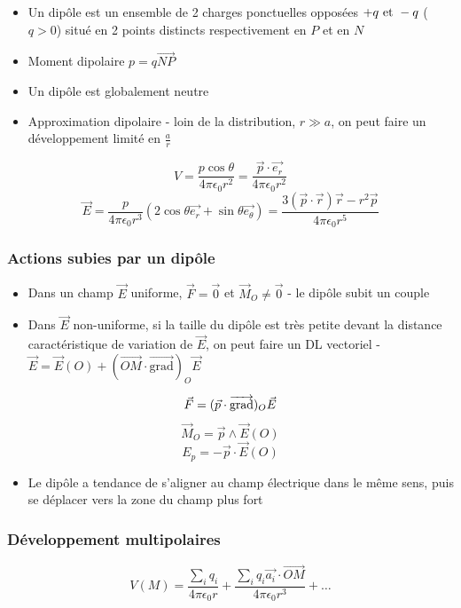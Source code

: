 \documentclass[openany]{book}
\begin{document}
\begin{itemize}
    \item Un dipôle est un ensemble de 2 charges ponctuelles opposées $+q \text{ et } -q$ ($q > 0$) situé en 2 points distincts respectivement en $P$ et en $N$
    \item Moment dipolaire $p = q \overrightarrow{NP}$  
    \item Un dipôle est globalement neutre
    \item Approximation dipolaire - loin de la distribution, $r \gg a$, on peut faire un développement limité en $\frac{a}{r}$
\end{itemize}

\[ V = \frac{p \cos \theta}{4 \pi \epsilon_0 r^2} = \frac{\vec{p}\cdot\vec{e_r}}{4\pi\epsilon_0 r^2} \]
\[ \vec{E} = \frac{p}{4 \pi\epsilon_0r^3}(2 \cos \theta \vec{e_r} + \sin \theta \vec{e_{\theta}}) = \frac{3(\vec{p} \cdot \vec{r})\vec{r} - r^2\vec{p}}{4\pi\epsilon_0r^5} \]

\subsubsection{Actions subies par un dipôle}

\begin{itemize}
    \item Dans un champ $\vec{E}$ uniforme, $\vec{F} = \vec{0}$ et $\vec{M}_O \neq \vec{0}$ - le dipôle subit un couple
    \item Dans $\vec{E}$ non-uniforme, si la taille du dipôle est très petite devant la distance caractéristique de variation de $\vec{E}$, on peut faire un DL vectoriel - $\vec{E} = \vec{E}(O) + (\overrightarrow{OM} \cdot \overrightarrow{\text{grad}})_O \vec{E}$ 
\end{itemize}

\[ \vec{F} = (\vec{p}\cdot\overrightarrow{{\text{grad}}})_O \vec{E} \]
\[ \vec{M}_O = \vec{p} \wedge \vec{E}(O) \]
\[ E_p = - \vec{p} \cdot \vec{E}(O) \]

\begin{itemize}
    \item Le dipôle a tendance de s'aligner au champ électrique dans le même sens, puis se déplacer vers la zone du champ plus fort
\end{itemize}

\subsubsection{Développement multipolaires}

\[ V(M) = \frac{\sum_{i} q_i}{4\pi\epsilon_0r} + \frac{\sum_{i} q_i \vec{a_i}\cdot \overrightarrow{OM}}{4\pi\epsilon_0r^3} + \dots \]
\end{document}
